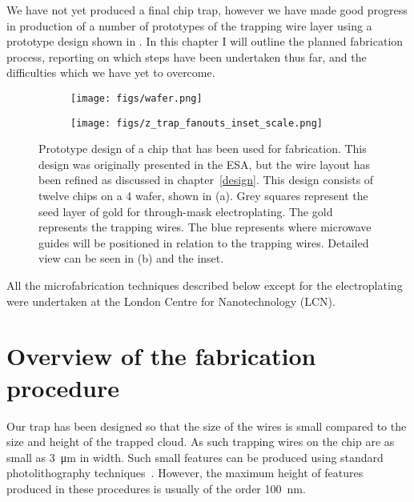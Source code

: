 We have not yet produced a final chip trap, however we have made good progress
in production of a number of prototypes of the trapping wire layer using a
prototype design shown in . In this chapter I will
outline the planned fabrication process, reporting on which steps have been
undertaken thus far, and the difficulties which we have yet to overcome.

\begin{figure}[h]
    \begin{subfigure}{.5\textwidth}
  \centering
      \texttt{[image: figs/wafer.png]}
      \caption{}
    \end{subfigure}
    \begin{subfigure}{.5\textwidth}
  \centering
      \texttt{[image: figs/z\_trap\_fanouts\_inset\_scale.png]}
      \caption{}
    \end{subfigure}
  \caption{
    Prototype design of a chip that has been used for fabrication. This design
    was originally presented in the ESA, but the wire layout has been refined
    as discussed in chapter~\ref{design}. This design consists of twelve chips
    on a \SI{4}{\inch} wafer, shown in (a). Grey squares represent the seed
    layer of gold for through-mask electroplating. The gold represents the
    trapping wires. The blue represents where microwave guides will be
    positioned in relation to the trapping wires. Detailed view can be seen in
    (b) and the inset.
  }
  \label{fab:fig:design1}
\end{figure}

All the microfabrication techniques described below except for the
electroplating were undertaken at the London Centre for Nanotechnology (LCN). 

\section{Overview of the fabrication procedure}

Our trap has been designed so that the size of the wires is small compared to
the size and height of the trapped cloud. As such trapping wires on the chip
are as small as \SI{3}{\micro\meter} in width. Such small features can be
produced using standard photolithography techniques~\cite{Madou2002}. However,
the maximum height of features produced in these procedures is usually of the
order \SI{100}{\nano\meter}.

